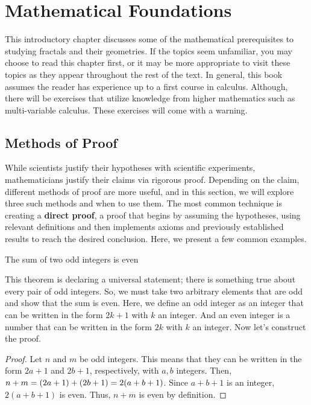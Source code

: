 \chapter{Mathematical Foundations}

\begin{summary}
    This introductory chapter discusses some of the mathematical prerequisites to studying fractals and their geometries. If the topics seem unfamiliar, you may choose to read this chapter first, or it may be more appropriate to visit these topics as they appear throughout the rest of the text. In general, this book assumes the reader has experience up to a first course in calculus. Although, there will be exercises that utilize knowledge from higher mathematics such as multi-variable calculus. These exercises will come with a warning. 
\end{summary}

\section{Methods of Proof}
While scientists justify their hypotheses with scientific experiments, mathematicians justify their claims via rigorous proof. Depending on the claim, different methods of proof are more useful, and in this section, we will explore three such methods and when to use them. The most common technique is creating a \textbf{direct proof}, a proof that begins by assuming the hypotheses, using relevant definitions and then implements axioms and previously established results to reach the desired conclusion. Here, we present a few common examples. 

\begin{theorem}
    The sum of two odd integers is even
\end{theorem}
This theorem is declaring a universal statement; there is something true about every pair of odd integers. So, we must take two arbitrary elements that are odd and show that the sum is even. Here, we define an odd integer as an integer that can be written in the form $2k+1$ with $k$ an integer. And an even integer is a number that can be written in the form $2k$
 with $k$ an integer. Now let's construct the proof.
 \clearpage
 
 \begin{proof}
    Let $n$ and $m$ be odd integers. This means that they can be written in the form $2a+1$ and $2b+1$, respectively, with $a,b$ integers. Then, $n+m= \linebreak (2a+1)+(2b+1)=2(a+b+1)$. Since $a+b+1$ is an integer, $2(a+b+1)$ is even. Thus, $n+m$ is even by definition. 
\end{proof}

